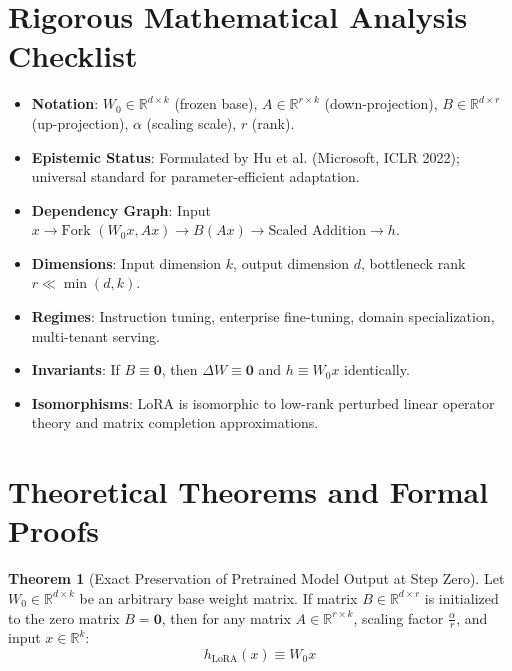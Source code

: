 \documentclass[11pt,a4paper]{article}
\theoremstyle{definition}
\newtheorem{theorem}{\textbf{Theorem}}[section]
\begin{document}
\section{Rigorous Mathematical Analysis Checklist}

\begin{itemize}
    \item \textbf{Notation}: $W_0 \in \mathbb{R}^{d \times k}$ (frozen base), $A \in \mathbb{R}^{r \times k}$ (down-projection), $B \in \mathbb{R}^{d \times r}$ (up-projection), $\alpha$ (scaling scale), $r$ (rank).
    \item \textbf{Epistemic Status}: Formulated by Hu et al. (Microsoft, ICLR 2022); universal standard for parameter-efficient adaptation.
    \item \textbf{Dependency Graph}: Input $x \to \text{Fork } (W_0 x, Ax) \to B(Ax) \to \text{Scaled Addition} \to h$.
    \item \textbf{Dimensions}: Input dimension $k$, output dimension $d$, bottleneck rank $r \ll \min(d, k)$.
    \item \textbf{Regimes}: Instruction tuning, enterprise fine-tuning, domain specialization, multi-tenant serving.
    \item \textbf{Invariants}: If $B \equiv \mathbf{0}$, then $\Delta W \equiv \mathbf{0}$ and $h \equiv W_0 x$ identically.
    \item \textbf{Isomorphisms}: LoRA is isomorphic to low-rank perturbed linear operator theory and matrix completion approximations.
\end{itemize}

\section{Theoretical Theorems and Formal Proofs}

\begin{theorem}[Exact Preservation of Pretrained Model Output at Step Zero]
Let $W_0 \in \mathbb{R}^{d \times k}$ be an arbitrary base weight matrix. If matrix $B \in \mathbb{R}^{d \times r}$ is initialized to the zero matrix $B = \mathbf{0}$, then for any matrix $A \in \mathbb{R}^{r \times k}$, scaling factor $\frac{\alpha}{r}$, and input $x \in \mathbb{R}^k$:
{\boldmath
\begin{equation}
h_{\text{LoRA}}(x) \equiv W_0 x
\end{equation}
}
\end{theorem}
\end{document}
